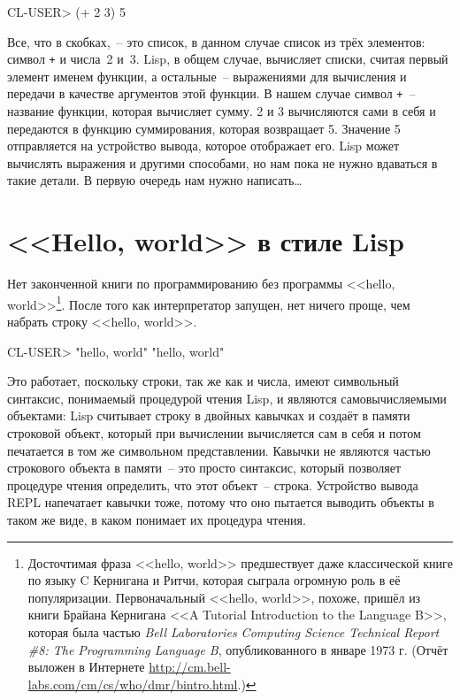 \begin{myverb}
CL-USER> (+ 2 3)
5
\end{myverb}

Все, что в скобках,~-- это список, в данном случае список из трёх элементов: символ \lstinline{+}
и числа~2 и~3. Lisp, в общем случае, вычисляет списки, считая первый элемент именем
функции, а остальные~-- выражениями для вычисления и передачи в качестве аргументов этой
функции. В нашем случае символ \lstinline{+}~-- название функции, которая вычисляет сумму. 2 и 3
вычисляются сами в себя и передаются в функцию суммирования, которая возвращает
5. Значение 5 отправляется на устройство вывода, которое отображает его. Lisp может
вычислять выражения и другими способами, но нам пока не нужно вдаваться в такие детали.
В первую очередь нам нужно написать\ldots

\section{<<Hello, world>> в стиле Lisp}

Нет законченной книги по программированию без программы <<hello,
world>>\footnote{Досточтимая фраза <<hello, world>> предшествует даже классической книге по
  языку C Кернигана и Ритчи, которая сыграла огромную роль в её
  популяризации. Первоначальный <<hello, world>>, похоже, пришёл из книги Брайана Кернигана <<A
  Tutorial Introduction to the Language B>>, которая была частью \emph{Bell Laboratories
  Computing Science Technical Report \#8: The Programming Language B}, опубликованного в
  январе 1973 г. (Отчёт выложен в Интернете
  \url{http://cm.bell-labs.com/cm/cs/who/dmr/bintro.html}.) }. После того как
интерпретатор запущен, нет ничего проще, чем набрать строку <<hello, world>>.

\begin{myverb}
CL-USER> "hello, world"
 "hello, world"
\end{myverb}

Это работает, поскольку строки, так же как и числа, имеют символьный синтаксис, понимаемый
процедурой чтения Lisp, и являются самовычисляемыми объектами: Lisp считывает строку в
двойных кавычках и создаёт в памяти строковой объект, который при вычислении вычисляется
сам в себя и потом печатается в том же символьном представлении.  Кавычки не являются
частью строкового объекта в памяти~-- это прос\-то синтаксис, который позволяет процедуре чтения
определить, что этот объект~-- строка. Устройство вывода REPL напечатает кавычки тоже,
потому что оно пытается выводить объекты в таком же виде, в каком понимает их процедура чтения.

